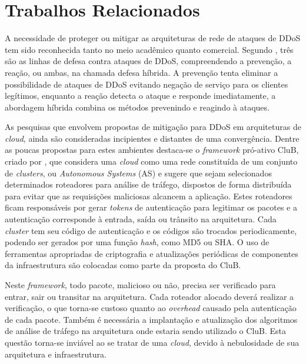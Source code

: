 \documentclass[a4paper, 12pt]{article}
\begin{document}
\section{Trabalhos Relacionados}

A necessidade de proteger ou mitigar as arquiteturas de rede de ataques de DDoS tem sido reconhecida tanto no meio acadêmico quanto comercial. Segundo \cite{1039856}, três são as linhas de defesa contra ataques de DDoS, compreendendo a prevenção, a reação, ou ambas, na chamada defesa híbrida. A prevenção tenta eliminar a possibilidade de ataques de DDoS evitando negação de serviço para os clientes legítimos, enquanto a reação detecta o ataque e responde imediatamente, a abordagem híbrida combina os métodos prevenindo e reagindo à ataques.

As pesquisas que envolvem propostas de mitigação para DDoS em arquiteturas de \emph{cloud}, ainda são consideradas incipientes e distantes de uma convergência. Dentre as poucas propostas para estes ambientes destaca-se o \emph{framework} pró-ativo CluB, criado por \cite{Hazelhurst:2008:SCU:1456659.1456671}, que considera uma \emph{cloud} como uma rede constituída de um conjunto de \emph{clusters}, ou \emph{Autonomous Systems} (AS) e sugere
que sejam selecionados determinados roteadores para análise de tráfego, dispostos de forma distribuída para evitar que as requisições maliciosas alcancem a aplicação. Estes roteadores ficam responsáveis por gerar \emph{tokens} de autenticação para legitimar os pacotes e a autenticação corresponde à entrada, saída ou trânsito na arquitetura. Cada \emph{cluster} tem seu código de autenticação e os códigos são trocados periodicamente, podendo ser gerados por uma função \emph{hash}, como MD5 ou SHA. O uso de ferramentas apropriadas de criptografia e atualizações periódicas de componentes da infraestrutura são colocadas como parte da proposta do CluB.



Neste \emph{framework}, todo pacote, malicioso ou não, precisa ser verificado para entrar, sair ou transitar na arquitetura. Cada roteador alocado  deverá realizar a verificação, o que torna-se custoso quanto ao \emph{overhead} causado pela autenticação de cada pacote. Também é necessária a implantação e atualização dos algoritmos de análise de tráfego na arquitetura onde estaria sendo utilizado o CluB. Esta questão torna-se inviável ao se tratar de uma \emph{cloud}, devido à nebulosidade de sua arquitetura e infraestrutura.
\end{document}
